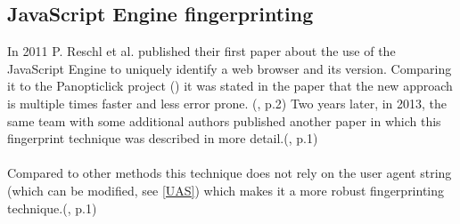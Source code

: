 \subsection{JavaScript Engine fingerprinting}
In 2011 P. Reschl et al. published their first paper about the use of the JavaScript Engine to uniquely identify a web browser and its version. Comparing it to the Panopticlick project (\textcite{eckersley10}) it was stated in the paper that the new approach is multiple times faster and less error prone. (\textcite{reschl11}, p.2) Two years later, in 2013, the same team with some additional authors published another paper in which this fingerprint technique was described in more detail.(\textcite{mulazzani13}, p.1) \\\\
Compared to other methods this technique does not rely on the user agent string (which can be modified, see \autoref{UAS}) which makes it a more robust fingerprinting technique.(\textcite{mulazzani13}, p.1)

